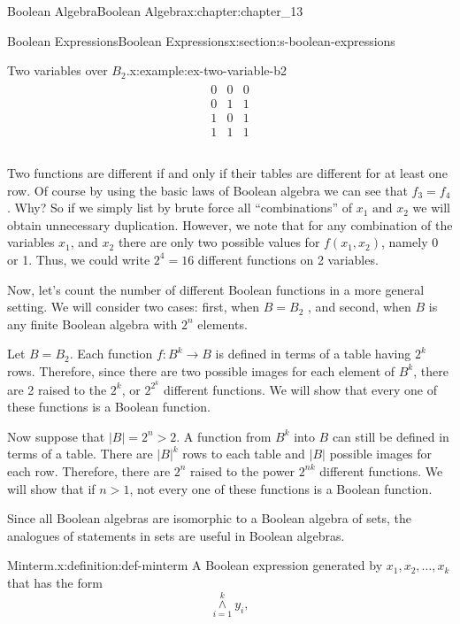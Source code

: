 \documentclass[twoside,10pt,]{book}
\numberwithin{equation}{section}
\begin{document}
\begin{chapterptx}{Boolean Algebra}{}{Boolean Algebra}{}{}{x:chapter:chapter_13}
\begin{sectionptx}{Boolean Expressions}{}{Boolean Expressions}{}{}{x:section:s-boolean-expressions}
\begin{example}{Two variables over \(B_2\).}{x:example:ex-two-variable-b2}
\begin{equation*}
\begin{array}{lr}
\begin{array}{cc|c}
\hline
0 & 0 & 0\\
0 & 1 & 1\\
1 & 0 & 1\\
1 & 1 & 1\\
\end{array}\\
\end{array}
\end{equation*}
%
\par
Two functions are different if and only if their tables are different for at least one row.  Of course by using the basic laws of Boolean algebra we can see that \(f_3=f_4\). Why? So if we simply list by brute force all ``combinations'' of \(x_1 \textrm{ and } x_2\) we will obtain unnecessary duplication. However, we note that for any combination of the variables \(x_1\), and \(x_2\) there are only two possible values for \(f\left(x_1, x_2\right)\), namely 0 or 1. Thus, we could write \(2^4=16\) different functions on 2 variables.%
\end{example}
Now, let's count the number of different Boolean functions in a more general setting. We will consider two cases: first, when \(B=B_2\) , and second, when \(B\) is any finite Boolean algebra with \(2^n\) elements.%
\par
Let \(B=B_2\). Each function \(f:B^k\to B\) is defined in terms of a table having \(2^k\) rows. Therefore, since there are two possible images for each element of \(B^k\), there are 2 raised to the \(2^k\), or  \(2^{2^k}\) different functions.  We will show that every one of these functions is a Boolean function.%
\par
Now suppose that \(\lvert B\rvert =2^n>2\). A function from \(B^k\) into \(B\) can still be defined in terms of a table. There are \(\lvert B\rvert^k\) rows to each table and \(\lvert B\rvert\) possible images for each row. Therefore, there are \(2^n\) raised to the power \(2^{nk}\) different functions. We will show that if \(n>1\), not every one of these functions is a Boolean function.%
\par
Since all Boolean algebras are isomorphic to a Boolean algebra of sets, the analogues of statements in sets are useful in Boolean algebras.%
\begin{definition}{Minterm.}{x:definition:def-minterm}%
%
\label{g:notation:idm404592703056}%
A Boolean expression generated by  \(x_1, x_2, \ldots , x_k\) that has the form%
\begin{equation*}
\underset{i=1}{\overset{k}{\land }}y_i,
\end{equation*}

\end{definition}
\end{sectionptx}
\end{chapterptx}
\end{document}
